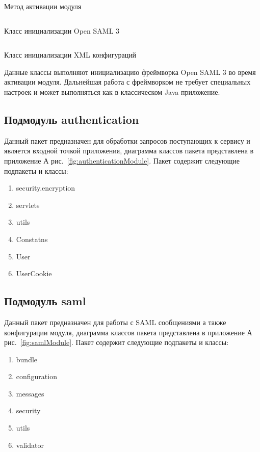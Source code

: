 \begin{longlisting}
\inputminted[linenos,frame=single]{java}{inc/src/Activator}
\caption{Метод активации модуля} 
\label{lst:activator}
\end{longlisting}

\begin{longlisting}
\inputminted[linenos,frame=single]{java}{inc/src/SamlInitializationSupport}
\caption{Класс инициализации Open SAML 3} 
\label{lst:samlInitialization}
\end{longlisting}

\begin{longlisting}
\inputminted[linenos,frame=single]{java}{inc/src/InitializationXMLConfigurator}
\caption{Класс инициализации XML конфигураций} 
\label{lst:xmlConfigurator}
\end{longlisting}

Данные классы выполняют инициализацию фреймворка Open SAML 3 во время активации модуля. Дальнейшая работа с фреймворком не требует специальных настроек и может выполняться как в классическом Java приложение.

\subsection{Подмодуль authentication}
Данный пакет предназначен для обработки запросов поступающих к сервису и является входной точкой приложения, диаграмма классов пакета представлена в приложение А рис.~\ref{fig:authenticationModule}. Пакет содержит следующие подпакеты и классы:
\begin{enumerate}
\item security.encryption
\item servlets
\item utils
\item Constatns
\item User
\item UserCookie
\end{enumerate}

\subsection{Подмодуль saml} 
Данный пакет предназначен для работы с SAML сообщениями а также конфигурации модуля, диаграмма классов пакета представлена в приложение А рис.~\ref{fig:samlModule}. Пакет содержит следующие подпакеты и классы:
\begin{enumerate}
\item bundle
\item configuration
\item messages
\item security
\item utils
\item validator
\end{enumerate}

